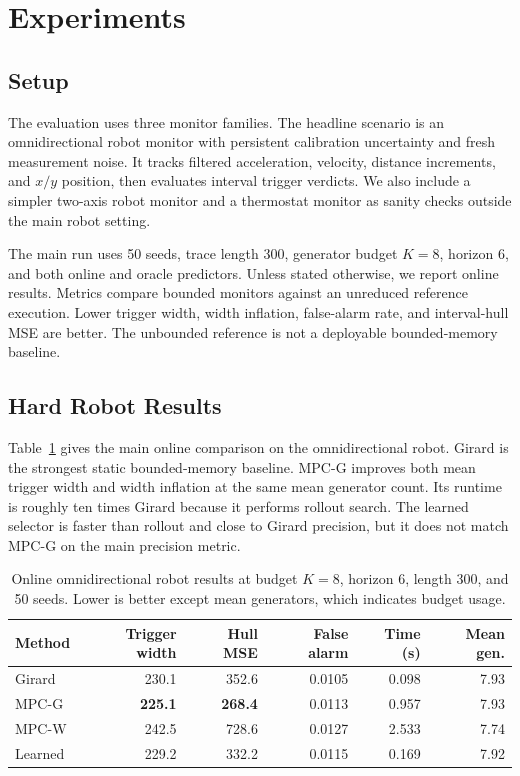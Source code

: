 \documentclass{article}
\newcommand{\mpcg}{\textsc{MPC-G}\xspace}
\newcommand{\mpcw}{\textsc{MPC-W}\xspace}
\begin{document}
\section{Experiments}

\subsection{Setup}

The evaluation uses three monitor families. The headline scenario is an
omnidirectional robot monitor with persistent calibration uncertainty and fresh
measurement noise. It tracks filtered acceleration, velocity, distance
increments, and \(x/y\) position, then evaluates interval trigger verdicts. We
also include a simpler two-axis robot monitor and a thermostat monitor as
sanity checks outside the main robot setting.

The main run uses 50 seeds, trace length 300, generator budget \(K=8\), horizon
6, and both online and oracle predictors. Unless stated otherwise, we report
online results. Metrics compare bounded monitors against an unreduced reference
execution. Lower trigger width, width inflation, false-alarm rate, and
interval-hull MSE are better. The unbounded reference is not a deployable
bounded-memory baseline.

\subsection{Hard Robot Results}

Table~\ref{tab:robot} gives the main online comparison on the
omnidirectional robot. Girard is the strongest static bounded-memory baseline.
\mpcg improves both mean trigger width and width inflation at the same mean
generator count. Its runtime is roughly ten times Girard because it performs
rollout search. The learned selector is faster than rollout and close to Girard
precision, but it does not match \mpcg on the main precision metric.

\begin{table}[t]
  \centering
  \caption{Online omnidirectional robot results at budget \(K=8\), horizon 6,
  length 300, and 50 seeds. Lower is better except mean generators, which
  indicates budget usage.}
  \label{tab:robot}
  \begin{tabular}{lrrrrr}
    \toprule
    Method & Trigger width & Hull MSE & False alarm & Time (s) & Mean gen. \\
    \midrule
    Girard & 230.1 & 352.6 & 0.0105 & 0.098 & 7.93 \\
    \mpcg & \textbf{225.1} & \textbf{268.4} & 0.0113 & 0.957 & 7.93 \\
    \mpcw & 242.5 & 728.6 & 0.0127 & 2.533 & 7.74 \\
    Learned & 229.2 & 332.2 & 0.0115 & 0.169 & 7.92 \\
    \bottomrule
  \end{tabular}
\end{table}
\end{document}
